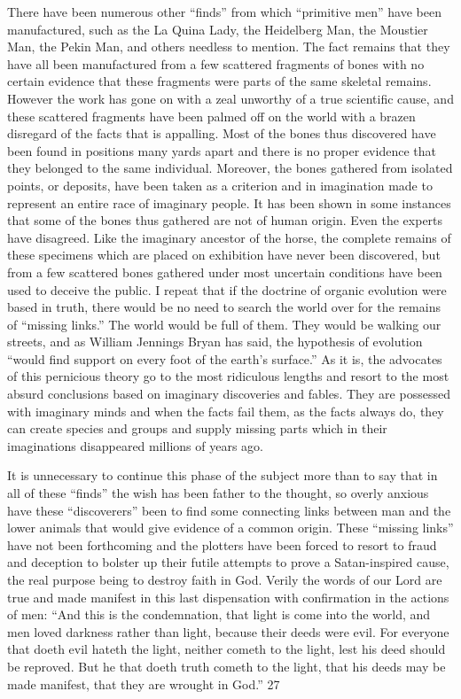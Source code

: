 There have been numerous other ``finds'' from which ``primitive men'' have been
manufactured, such as the La Quina Lady, the Heidelberg Man, the Moustier Man, the Pekin
Man, and others needless to mention. The fact remains that they have all been manufactured
from a few scattered fragments of bones with no certain evidence that these fragments were
parts of the same skeletal remains. However the work has gone on with a zeal unworthy of a
true scientific cause, and these scattered fragments have been palmed off on the world with a
brazen disregard of the facts that is appalling. Most of the bones thus discovered have been
found in positions many yards apart and there is no proper evidence that they belonged to the
same individual. Moreover, the bones gathered from isolated points, or deposits, have been
taken as a criterion and in imagination made to represent an entire race of imaginary people.
It has been shown in some instances that some of the bones thus gathered are not of human
origin. Even the experts have disagreed. Like the imaginary ancestor of the horse, the
complete remains of these specimens which are placed on exhibition have never been
discovered, but from a few scattered bones gathered under most uncertain conditions have
been used to deceive the public. I repeat that if the doctrine of organic evolution were based
in truth, there would be no need to search the world over for the remains of ``missing links.''
The world would be full of them. They would be walking our streets, and as William
Jennings Bryan has said, the hypothesis of evolution ``would find support on every foot of the
earth's surface.'' As it is, the advocates of this pernicious theory go to the most ridiculous
lengths and resort to the most absurd conclusions based on imaginary discoveries and fables.
They are possessed with imaginary minds and when the facts fail them, as the facts always
do, they can create species and groups and supply missing parts which in their imaginations
disappeared millions of years ago.

It is unnecessary to continue this phase of the subject more than to say that in all of these
``finds'' the wish has been father to the thought, so overly anxious have these ``discoverers''
been to find some connecting links between man and the lower animals that would give
evidence of a common origin. These ``missing links'' have not been forthcoming and the
plotters have been forced to resort to fraud and deception to bolster up their futile attempts to
prove a Satan-inspired cause, the real purpose being to destroy faith in God. Verily the words
of our Lord are true and made manifest in this last dispensation with confirmation in the
actions of men: ``And this is the condemnation, that light is come into the world, and men
loved darkness rather than light, because their deeds were evil. For everyone that doeth evil
hateth the light, neither cometh to the light, lest his deed should be reproved. But he that
doeth truth cometh to the light, that his deeds may be made manifest, that they are wrought in
God.'' 27

